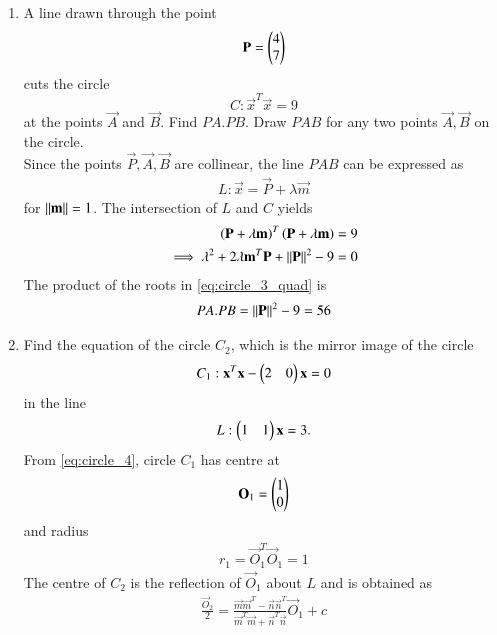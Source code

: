 \documentclass[journal,12pt,twocolumn]{IEEEtran}
\begin{document}
\begin{enumerate}[label=\arabic*]
\item A line drawn through the point 
\begin{equation}
\label{eq:circle_3_p}
\mathbf{P} = \begin{pmatrix}4\\7\end{pmatrix} 
\end{equation}
cuts the circle
\begin{equation}
\label{eq:circle_3}
C: \vec{x}^T\vec{x}  = 9
\end{equation}
at the points $\vec{A}$ and $\vec{B}$. Find $PA.PB$. Draw $PAB$ for any two points $\vec{A},\vec{B}$ on the circle.
\\
\solution Since the points $\vec{P},\vec{A},\vec{B}$ are collinear, the line $PAB$ can be expressed as
\begin{align}
L: \vec{x} = \vec{P} + \lambda \vec{m}
\label{eq:circle_3_pab}
\end{align}
%
for $\left\Vert\mathbf{m}\right\Vert = 1$. The intersection of $L$ and $C$  yields
\begin{align}
\left(\mathbf{P}+ \lambda \mathbf{m}\right)^T
\left(\mathbf{P} + \lambda \mathbf{m}\right) &= 9
\nonumber \\
\implies \lambda^2 + 2\lambda \mathbf{m}^T\mathbf{P} + \left\Vert\mathbf{P}\right\Vert^2-9 &= 0
\label{eq:circle_3_quad}
\end{align}
%
The product of the roots in \eqref{eq:circle_3_quad} is 
\begin{align}
\label{eq:circle_3_prod}
PA.PB =\left\Vert\mathbf{P}\right\Vert^2-9 = 56
\end{align}
%
\item Find the equation of the circle $C_2$, which is the mirror image of the circle
\begin{equation}
C_1: 
\mathbf{x}^T\mathbf{x} -\begin{pmatrix}2 & 0 \end{pmatrix}\mathbf{x} = 0
\label{eq:circle_4}
\end{equation}
in the line
\begin{equation}
L: \begin{pmatrix}1 & 1\end{pmatrix}\mathbf{x} = 3.
\label{eq:circle_4_line}
\end{equation}
\solution From  \eqref{eq:circle_4}, circle $C_1$ has centre at 
\begin{align}
\label{eq:circle_4_o1}
\mathbf{O}_1 = \begin{pmatrix}1 \\ 0 \end{pmatrix}
\end{align}
%
and radius 
\begin{align}
\label{eq:circle_4_r1}
r_1 = \vec{O}_1^T\vec{O}_1 = 1
\end{align}
%
The centre of $C_2$ is the reflection of $\vec{O}_1$ about $L$ and is obtained as 
\begin{align}
\label{eq:circle_4_o2}
\frac{\vec{O}_2}{2} = \frac{\vec{m}\vec{m}^T-\vec{n}\vec{n}^T}{\vec{m}^T\vec{m}+\vec{n}^T\vec{n}}\vec{O}_1 + c 

\end{align}
\end{enumerate}
\end{document}

